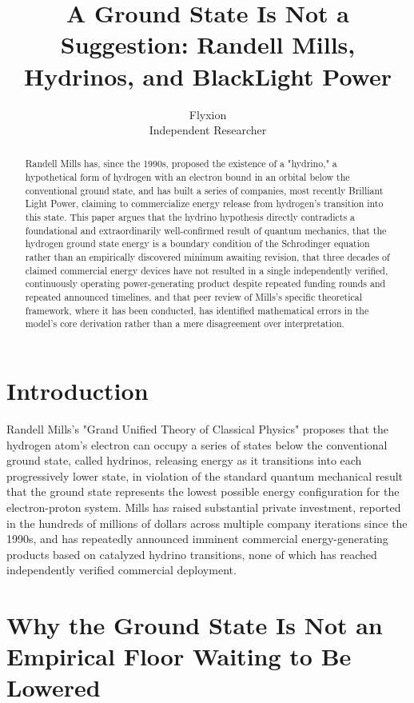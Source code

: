 \documentclass[11pt]{article}
\title{A Ground State Is Not a Suggestion: Randell Mills, Hydrinos, and BlackLight Power}
\author{Flyxion \\ \small Independent Researcher}
\date{}
\begin{document}
\maketitle

\begin{abstract}
Randell Mills has, since the 1990s, proposed the existence of a "hydrino," a hypothetical form of hydrogen with an electron bound in an orbital below the conventional ground state, and has built a series of companies, most recently Brilliant Light Power, claiming to commercialize energy release from hydrogen's transition into this state. This paper argues that the hydrino hypothesis directly contradicts a foundational and extraordinarily well-confirmed result of quantum mechanics, that the hydrogen ground state energy is a boundary condition of the Schrodinger equation rather than an empirically discovered minimum awaiting revision, that three decades of claimed commercial energy devices have not resulted in a single independently verified, continuously operating power-generating product despite repeated funding rounds and repeated announced timelines, and that peer review of Mills's specific theoretical framework, where it has been conducted, has identified mathematical errors in the model's core derivation rather than a mere disagreement over interpretation.
\end{abstract}

\section{Introduction}

Randell Mills's "Grand Unified Theory of Classical Physics" proposes that the hydrogen atom's electron can occupy a series of states below the conventional ground state, called hydrinos, releasing energy as it transitions into each progressively lower state, in violation of the standard quantum mechanical result that the ground state represents the lowest possible energy configuration for the electron-proton system. Mills has raised substantial private investment, reported in the hundreds of millions of dollars across multiple company iterations since the 1990s, and has repeatedly announced imminent commercial energy-generating products based on catalyzed hydrino transitions, none of which has reached independently verified commercial deployment.

\section{Why the Ground State Is Not an Empirical Floor Waiting to Be Lowered}
\end{document}
